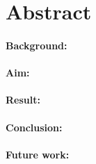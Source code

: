 \chapter{Abstract}

\subsubsection*{Background:}
\subsubsection*{Aim:}
\subsubsection*{Result:}
\subsubsection*{Conclusion:}
\subsubsection*{Future work:}